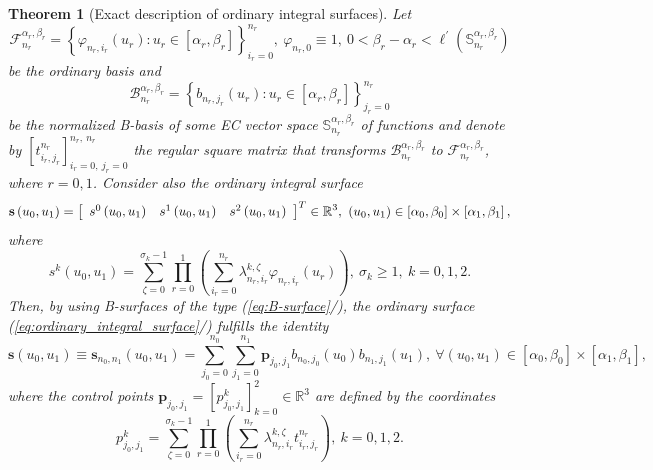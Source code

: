 \documentclass[b5paper, twosided]{book}
\newtheorem{theorem}{Theorem}[chapter]
\DeclareRobustCommand{\mref}[1]{\ref{#1}{\relsize{-1}/\pageref{#1}}}
\begin{document}
\begin{theorem}
	[Exact description of ordinary integral surfaces]\label{thm:integral_surfaces}%
	Let
	\[
	\mathcal{F}_{n_{r}}^{\alpha_{r},\beta_{r}}=\left\{  \varphi_{n_{r},i_{r}}\left(  u_{r}\right)  :u_{r}\in\left[
	\alpha_{r},\beta_{r}\right]  \right\}  _{i_{r}=0}^{n_{r}},~\varphi_{n_{r},0} \equiv 1,~0<\beta_r - \alpha_r < \ell^{\prime}\left(\mathbb{S}_{n_r}^{\alpha_r,\beta_r}\right)
	\]
	be the ordinary basis and
	$$
	\mathcal{B}_{n_{r}}^{\alpha_{r},\beta_{r}}=\left\{  b_{n_{r},j_{r}}\left(
	u_{r}\right)  :u_{r}\in\left[  \alpha_{r},\beta_{r}\right]  \right\}
	_{j_{r}=0}^{n_{r}}
	$$
	be the normalized B-basis of some EC vector space $\mathbb{S}%
	_{n_{r}}^{\alpha_{r},\beta_{r}}$ of functions and denote by $[  t_{i_{r},j_{r}}^{n_{r}}]  _{i_{r}=0,~j_{r}=0}%
	^{n_{r},~n_{r}}$ the regular square matrix that transforms $\mathcal{B}%
	_{n_{r}}^{\alpha_{r},\beta_{r}}$ to $\mathcal{F}_{n_{r}}^{\alpha_{r},\beta
		_{r}}$, where $r=0,1$. Consider also the ordinary integral surface%
	\begin{equation}
	\mathbf{s}\left(  u_0, u_1\right)  =\left[
	\begin{array}
	[c]{ccc}%
	s^{0}\left(  u_0, u_1\right)   & s^{1}\left(  u_0, u_1\right)   &
	s^{2}\left(  u_0, u_1\right)
	\end{array}
	\right]  ^{T}\in%
	\mathbb{R}
	^{3},~\left(u_0, u_1\right)\in\left[  \alpha_{0}%
	,\beta_{0}\right]  \times\left[  \alpha_{1},\beta_{1}\right],
	\label{eq:ordinary_integral_surface}%
	\end{equation}
	where%
	\begin{equation*}
	s^{k}\left(  u_0, u_1\right)  =\sum_{\zeta=0}^{\sigma_{k}-1}\prod_{r=0}%
	^{1}\left(  \sum_{i_{r}=0}^{n_{r}}\lambda_{n_r,i_{r}}^{k,\zeta}\varphi
	_{n_{r},i_{r}}\left(  u_{r}\right)  \right)  ,~\sigma_{k}\geq 1, ~k
	=0,1,2. %
	\end{equation*}
	Then, by using B-surfaces of the type (\mref{eq:B-surface}), the ordinary surface
	(\mref{eq:ordinary_integral_surface}) fulfills the identity
	\begin{equation*}
	\mathbf{s}\left(  u_0, u_1\right) \equiv \mathbf{s}_{n_0,n_1}\left(u_0, u_1\right) =\sum_{j_{0}=0}^{n_{0}}\sum
	_{j_{1}=0}^{n_{1}}\mathbf{p}_{j_{0},j_{1}}b_{n_{0},j_{0}}\left(  u_{0}\right)
	b_{n_{1},j_{1}}\left(  u_{1}\right)  ,~\forall\left(u_0,u_1\right)\in\left[  \alpha_{0},\beta_{0}\right]  \times\left[  \alpha
	_{1},\beta_{1}\right], %
	\end{equation*}
	where the control points $\mathbf{p}_{j_{0},j_{1}}=[
	p_{j_{0},j_{1}}^{k}]_{k=0}^{2}\in%
	\mathbb{R}
	^{3}$ are defined by the coordinates%
	\begin{equation}
	p_{j_{0},j_{1}}^{k}=\sum_{\zeta=0}^{\sigma_{k}-1}\prod_{r=0}^{1}\left(\sum_{i_{r}=0}^{n_{r}}\lambda_{n_r, i_{r}%
	}^{k,\zeta}t_{i_{r},j_{r}}^{n_{r}}\right),~k
	=0,1,2.\label{eq:cpbed_ordinary_surfaces}%
	\end{equation}
	
\end{theorem}
\end{document}
